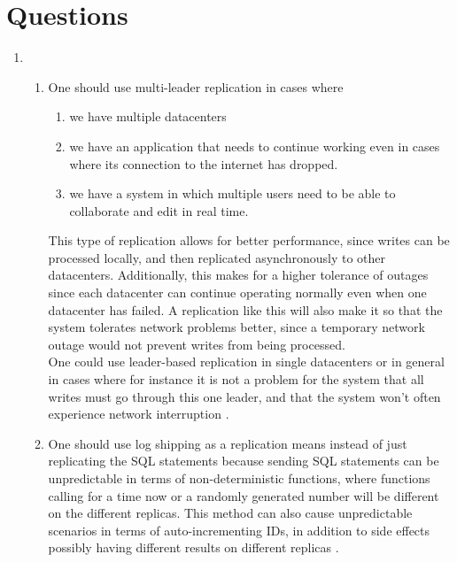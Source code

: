 \section{Questions}

\begin{enumerate}
    \item 
        \begin{enumerate}
            \item One should use multi-leader replication in cases where 
                \begin{enumerate} 
                    \item we have multiple datacenters
                    \item we have an application that needs to continue working
                        even in cases where its connection to the internet 
                        has dropped.
                    \item we have a system in which multiple users need to be 
                        able to collaborate and edit in real time.
                \end{enumerate}
                This type of replication allows for better performance, since 
                writes can be processed locally, and then replicated 
                asynchronously to other datacenters. Additionally, this makes 
                for a higher tolerance of outages since each datacenter can 
                continue operating normally even when one datacenter has failed. 
                A replication like this will also make it so that the system
                tolerates network problems better, since a temporary network
                outage would not prevent writes from being processed.
                \\ One could use leader-based replication in single datacenters or
                in general in cases where for instance it is not a problem for 
                the system that all writes must go through this one leader, and 
                that the system won't often experience network interruption
                \cite[pp.~168-170]{kleppmann_2017}.
            \item One should use log shipping as a replication means instead of
                just replicating the SQL statements because sending SQL
                statements can be unpredictable in terms of non-deterministic
                functions, where functions calling for a time now or a randomly
                generated number will be different on the different replicas. 
                This method can also cause unpredictable scenarios in terms of
                auto-incrementing IDs, in addition to side effects
                possibly having different results on different replicas 
                \cite[p.~159]{kleppmann_2017}.
        \end{enumerate}
  \end{enumerate}
